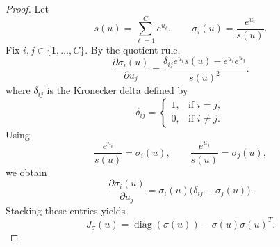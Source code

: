 \documentclass[10pt,a4paper]{amsart}
\begin{document}
\begin{proof}
Let
\[
s(u)=\sum_{\ell=1}^C e^{u_\ell},
\qquad
\sigma_i(u)=\frac{e^{u_i}}{s(u)}.
\]
Fix $i,j\in\{1,\dots,C\}$. By the quotient rule,
\[
\frac{\partial \sigma_i(u)}{\partial u_j}
=
\frac{\delta_{ij} e^{u_i}s(u)-e^{u_i}e^{u_j}}{s(u)^2}.
\]
where $\delta_{ij}$ is the Kronecker delta defined by
\[
\delta_{ij} =
\begin{cases}
1, & \text{if } i=j,\\
0, & \text{if } i\neq j.
\end{cases}
\]
Using
\[
\frac{e^{u_i}}{s(u)}=\sigma_i(u),
\qquad
\frac{e^{u_j}}{s(u)}=\sigma_j(u),
\]
we obtain
\[
\frac{\partial \sigma_i(u)}{\partial u_j}
=
\sigma_i(u)\bigl(\delta_{ij}-\sigma_j(u)\bigr).
\]
Stacking these entries yields
\[
J_\sigma(u)=\operatorname{diag}(\sigma(u))-\sigma(u)\sigma(u)^T.
\]
\end{proof}
\end{document}
